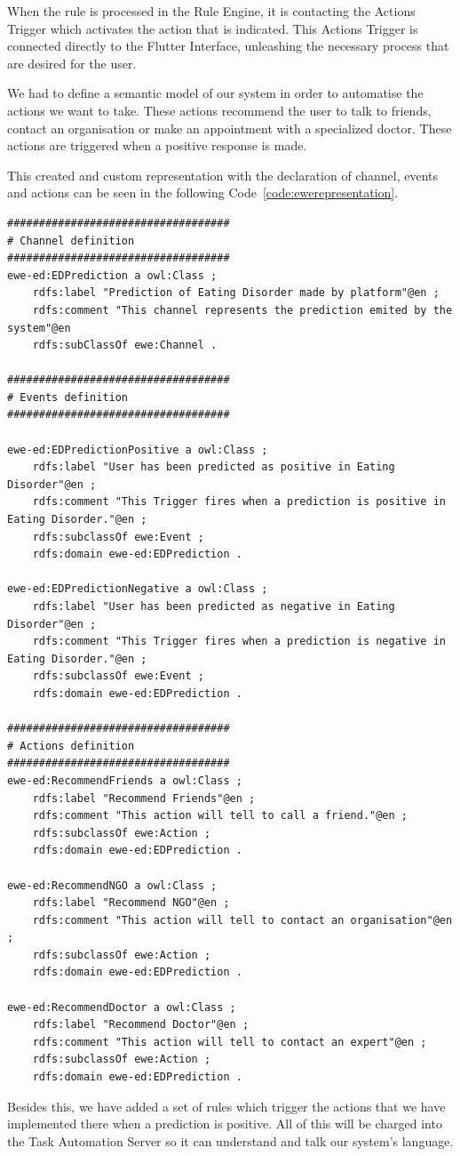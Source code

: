 When the rule is processed in the Rule Engine, it is contacting the Actions Trigger which activates the action that is indicated. This Actions Trigger is connected directly to the Flutter Interface, unleashing the necessary process that are desired for the user.


We had to define a semantic model of our system in order to automatise the actions we want to take. These actions recommend the user to talk to friends, contact an organisation or make an appointment with a specialized doctor. These actions are triggered when a positive response is made.


This created and custom representation with the declaration of channel, events and actions can be seen in the following Code~\ref{code:ewerepresentation}.

\begin{lstlisting}[label={code:ewerepresentation}, caption={Custom semantic representation implemented}]
###################################
# Channel definition
###################################
ewe-ed:EDPrediction a owl:Class ;    
    rdfs:label "Prediction of Eating Disorder made by platform"@en ;
    rdfs:comment "This channel represents the prediction emited by the system"@en
    rdfs:subClassOf ewe:Channel .

###################################
# Events definition
###################################

ewe-ed:EDPredictionPositive a owl:Class ;
    rdfs:label "User has been predicted as positive in Eating Disorder"@en ;
    rdfs:comment "This Trigger fires when a prediction is positive in Eating Disorder."@en ;
    rdfs:subclassOf ewe:Event ;
    rdfs:domain ewe-ed:EDPrediction .

ewe-ed:EDPredictionNegative a owl:Class ;
    rdfs:label "User has been predicted as negative in Eating Disorder"@en ;
    rdfs:comment "This Trigger fires when a prediction is negative in Eating Disorder."@en ;
    rdfs:subclassOf ewe:Event ;
    rdfs:domain ewe-ed:EDPrediction .

###################################
# Actions definition
###################################
ewe-ed:RecommendFriends a owl:Class ;
    rdfs:label "Recommend Friends"@en ;
    rdfs:comment "This action will tell to call a friend."@en ;
    rdfs:subclassOf ewe:Action ;
    rdfs:domain ewe-ed:EDPrediction .

ewe-ed:RecommendNGO a owl:Class ;
    rdfs:label "Recommend NGO"@en ;
    rdfs:comment "This action will tell to contact an organisation"@en ;
    rdfs:subclassOf ewe:Action ;
    rdfs:domain ewe-ed:EDPrediction .

ewe-ed:RecommendDoctor a owl:Class ;
    rdfs:label "Recommend Doctor"@en ;
    rdfs:comment "This action will tell to contact an expert"@en ;
    rdfs:subclassOf ewe:Action ;
    rdfs:domain ewe-ed:EDPrediction .

\end{lstlisting}

Besides this, we have added a set of rules which trigger the actions that we have implemented there when a prediction is positive. All of this will be charged into the Task Automation Server so it can understand and talk our system's language.

